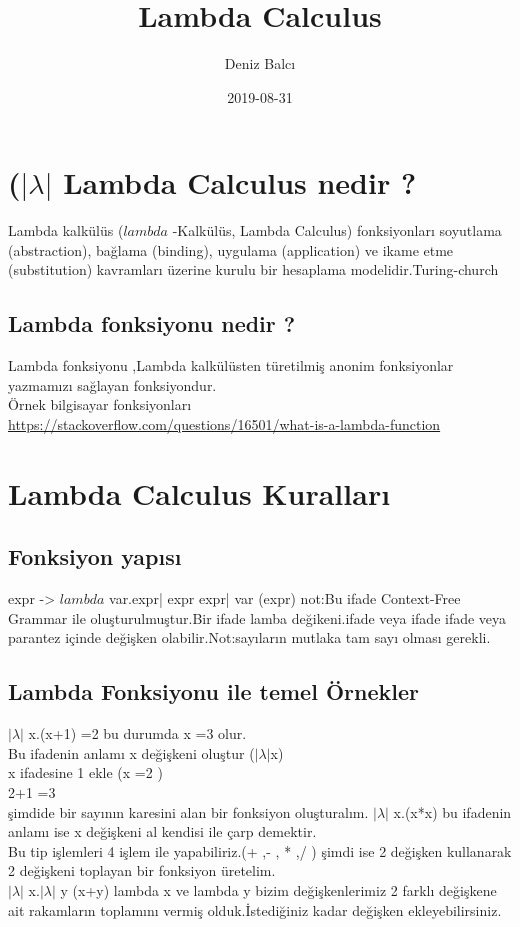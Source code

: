\documentclass[12pt]{article}
\title{Lambda Calculus}
\date{2019-08-31}
\author{Deniz Balcı}
\begin{document}
  \maketitle
  
  
  \section{ ($|\lambda|$ Lambda Calculus nedir ?}
   Lambda kalkülüs ($lambda$ -Kalkülüs, Lambda Calculus) fonksiyonları soyutlama (abstraction), bağlama (binding), uygulama (application) ve ikame etme (substitution) kavramları üzerine kurulu bir hesaplama modelidir.Turing-church
\subsection{Lambda fonksiyonu nedir ?}
Lambda fonksiyonu ,Lambda kalkülüsten türetilmiş anonim fonksiyonlar yazmamızı sağlayan fonksiyondur.
\\
Örnek bilgisayar fonksiyonları
\\
\href{https://stackoverflow.com/questions/16501/what-is-a-lambda-function}{https://stackoverflow.com/questions/16501/what-is-a-lambda-function}

\section{Lambda Calculus Kuralları}
\subsection{Fonksiyon yapısı}
expr -> $lambda$ var.expr| expr expr| var (expr)
not:Bu ifade Context-Free Grammar ile oluşturulmuştur.Bir ifade lamba değikeni.ifade veya ifade ifade veya parantez içinde değişken olabilir.Not:sayıların mutlaka tam sayı olması gerekli.
\subsection{Lambda Fonksiyonu ile temel  Örnekler}
$|\lambda|$ x.(x+1) =2 bu durumda x =3 olur.\\
Bu ifadenin anlamı x değişkeni oluştur ($|\lambda|$x)\\
x ifadesine 1 ekle  (x =2 )\\
2+1 =3 \\
 şimdide bir sayının karesini alan bir fonksiyon oluşturalım.
 $|\lambda|$ x.(x*x)  bu ifadenin anlamı ise 
x değişkeni al kendisi ile çarp demektir.\\
Bu tip işlemleri 4 işlem ile yapabiliriz.(+ ,- , * ,/ ) şimdi ise 2 değişken kullanarak 2 değişkeni toplayan bir fonksiyon üretelim.\\
$|\lambda|$ x.$|\lambda|$ y (x+y) lambda x ve lambda y bizim değişkenlerimiz 2 farklı değişkene ait rakamların toplamını vermiş olduk.İstediğiniz kadar değişken ekleyebilirsiniz.
\end{document}
